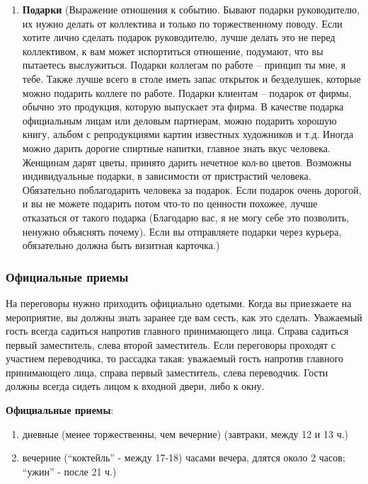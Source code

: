 \documentclass[a4paper,14pt]{extarticle}
\begin{document}
\begin{enumerate}
    \item \textbf{Подарки} (Выражение отношения к событию. Бывают подарки руководителю, их нужно делать от коллектива и только по торжественному поводу. Если хотите лично сделать подарок руководителю, лучше делать это не перед коллективом, к вам может испортиться отношение, подумают, что вы пытаетесь выслужиться. Подарки коллегам по работе – принцип ты мне, я тебе. Также лучше всего в столе иметь запас открыток и безделушек, которые можно подарить коллеге по работе. Подарки клиентам – подарок от фирмы, обычно это продукция, которую выпускает эта фирма. В качестве подарка официальным лицам или деловым партнерам, можно подарить хорошую книгу, альбом с репродукциями картин известных художников и т.д. Иногда можно дарить дорогие спиртные напитки, главное знать вкус человека. Женщинам дарят цветы, принято дарить нечетное кол-во цветов. Возможны индивидуальные подарки, в зависимости от пристрастий человека. Обязательно поблагодарить человека за подарок. Если подарок очень дорогой, и вы не можете подарить потом что-то по ценности похожее, лучше отказаться от такого подарка (Благодарю вас, я не могу себе это позволить, ненужно объяснять почему). Если вы отправляете подарки через курьера, обязательно должна быть визитная карточка.)
\end{enumerate}

\subsubsection{Официальные приемы}

На переговоры нужно приходить официально одетыми. Когда вы приезжаете на мероприятие, вы должны знать заранее где вам сесть, как это сделать. Уважаемый гость всегда садиться напротив главного принимающего лица. Справа садиться первый заместитель, слева второй заместитель. Если переговоры проходят с участием переводчика, то рассадка такая: уважаемый гость напротив главного принимающего лица, справа первый заместитель, слева переводчик. Гости должны всегда сидеть лицом к входной двери, либо к окну.

\textbf{Официальные приемы}:

\begin{enumerate}
    \item дневные (менее торжественны, чем вечерние) (завтраки, между 12 и 13 ч.)
    \item вечерние (“коктейль” - между 17-18) часами вечера, длятся около 2 часов; “ужин” - после 21 ч.)
\end{enumerate}
\end{document}
